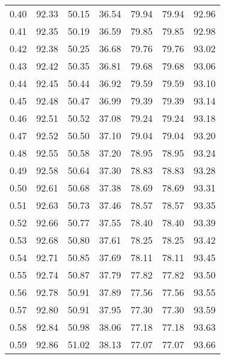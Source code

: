 \begin{tabular}{|c|c|c|c|c|c|c|}
      0.40 &     92.33 &     50.15 &      36.54 &   79.94 &      79.94 &         92.96 \\
      0.41 &     92.35 &     50.19 &      36.59 &   79.85 &      79.85 &         92.98 \\
      0.42 &     92.38 &     50.25 &      36.68 &   79.76 &      79.76 &         93.02 \\
      0.43 &     92.42 &     50.35 &      36.81 &   79.68 &      79.68 &         93.06 \\
      0.44 &     92.45 &     50.44 &      36.92 &   79.59 &      79.59 &         93.10 \\
      0.45 &     92.48 &     50.47 &      36.99 &   79.39 &      79.39 &         93.14 \\
      0.46 &     92.51 &     50.52 &      37.08 &   79.24 &      79.24 &         93.18 \\
      0.47 &     92.52 &     50.50 &      37.10 &   79.04 &      79.04 &         93.20 \\
      0.48 &     92.55 &     50.58 &      37.20 &   78.95 &      78.95 &         93.24 \\
      0.49 &     92.58 &     50.64 &      37.30 &   78.83 &      78.83 &         93.28 \\
      0.50 &     92.61 &     50.68 &      37.38 &   78.69 &      78.69 &         93.31 \\
      0.51 &     92.63 &     50.73 &      37.46 &   78.57 &      78.57 &         93.35 \\
      0.52 &     92.66 &     50.77 &      37.55 &   78.40 &      78.40 &         93.39 \\
      0.53 &     92.68 &     50.80 &      37.61 &   78.25 &      78.25 &         93.42 \\
      0.54 &     92.71 &     50.85 &      37.69 &   78.11 &      78.11 &         93.45 \\
      0.55 &     92.74 &     50.87 &      37.79 &   77.82 &      77.82 &         93.50 \\
      0.56 &     92.78 &     50.91 &      37.89 &   77.56 &      77.56 &         93.55 \\
      0.57 &     92.80 &     50.91 &      37.95 &   77.30 &      77.30 &         93.59 \\
      0.58 &     92.84 &     50.98 &      38.06 &   77.18 &      77.18 &         93.63 \\
      0.59 &     92.86 &     51.02 &      38.13 &   77.07 &      77.07 &         93.66 \\

\end{tabular}
